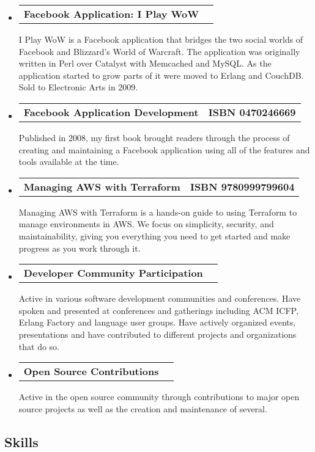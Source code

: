 \documentclass[10pt,letterpaper]{article}
\makeatletter
\newcommand{\headerrow}[2]
{\begin{tabular*}{\linewidth}{l@{\extracolsep{\fill}}r}
  #1 &
  #2 \\
\end{tabular*}}
\makeatother
\begin{document}
\begin{itemize}
  \parskip=0.1em

  \item
  \headerrow
    {\textbf{Facebook Application: I Play WoW}}
    {\textbf{}}
    I Play WoW is a Facebook application that bridges the two social worlds of Facebook and Blizzard's World of Warcraft. The application was originally written in Perl over Catalyst with Memcached and MySQL. As the application started to grow parts of it were moved to Erlang and CouchDB. Sold to Electronic Arts in 2009.
  \item
  \headerrow
    {\textbf{Facebook Application Development}}
    {\textbf{ISBN 0470246669}}
    Published in 2008, my first book brought readers through the process of creating and maintaining a Facebook application using all of the features and tools available at the time.
  \item
  \headerrow
    {\textbf{Managing AWS with Terraform}}
    {\textbf{ISBN 9780999799604}}
    Managing AWS with Terraform is a hands-on guide to using Terraform to manage environments in AWS. We focus on simplicity, security, and maintainability, giving you everything you need to get started and make progress as you work through it.
  \item
  \headerrow
    {\textbf{Developer Community Participation}}
    {\textbf{}}
    Active in various software development communities and conferences. Have spoken and presented at conferences and gatherings including ACM ICFP, Erlang Factory and language user groups. Have actively organized events, presentations and have contributed to different projects and organizations that do so.
  \item
  \headerrow
    {\textbf{Open Source Contributions}}
    {\textbf{}}
    Active in the open source community through contributions to major open source projects as well as the creation and maintenance of several.
\end{itemize}

\vspace{-0.4em}
\subsection*{Skills}
\end{document}
